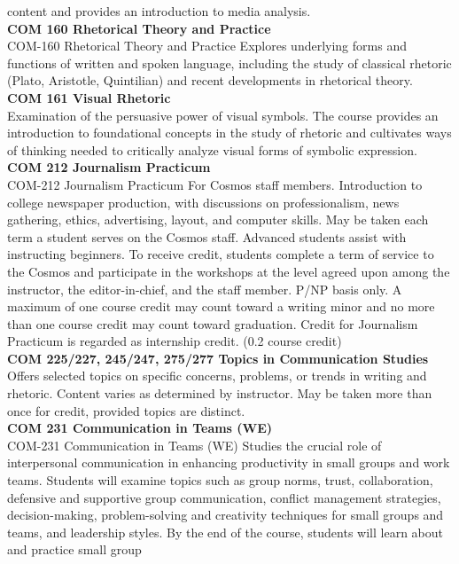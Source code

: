 \documentclass[
  letterpaper,
]{scrbook}
\begin{document}
content and provides an introduction to media analysis.\\
\textbf{COM 160 Rhetorical Theory and Practice}\\
COM-160 Rhetorical Theory and Practice Explores underlying forms and
functions of written and spoken language, including the study of
classical rhetoric (Plato, Aristotle, Quintilian) and recent
developments in rhetorical theory.\\
\textbf{COM 161 Visual Rhetoric}\\
Examination of the persuasive power of visual symbols. The course
provides an introduction to foundational concepts in the study of
rhetoric and cultivates ways of thinking needed to critically analyze
visual forms of symbolic expression.\\
\textbf{COM 212 Journalism Practicum}\\
COM-212 Journalism Practicum For Cosmos staff members. Introduction to
college newspaper production, with discussions on professionalism, news
gathering, ethics, advertising, layout, and computer skills. May be
taken each term a student serves on the Cosmos staff. Advanced students
assist with instructing beginners. To receive credit, students complete
a term of service to the Cosmos and participate in the workshops at the
level agreed upon among the instructor, the editor-in-chief, and the
staff member. P/NP basis only. A maximum of one course credit may count
toward a writing minor and no more than one course credit may count
toward graduation. Credit for Journalism Practicum is regarded as
internship credit. (0.2 course credit)\\
\textbf{COM 225/227, 245/247, 275/277 Topics in Communication Studies}\\
Offers selected topics on specific concerns, problems, or trends in
writing and rhetoric. Content varies as determined by instructor. May be
taken more than once for credit, provided topics are distinct.\\
\textbf{COM 231 Communication in Teams (WE)}\\
COM-231 Communication in Teams (WE) Studies the crucial role of
interpersonal communication in enhancing productivity in small groups
and work teams. Students will examine topics such as group norms, trust,
collaboration, defensive and supportive group communication, conflict
management strategies, decision-making, problem-solving and creativity
techniques for small groups and teams, and leadership styles. By the end
of the course, students will learn about and practice small group
\end{document}
